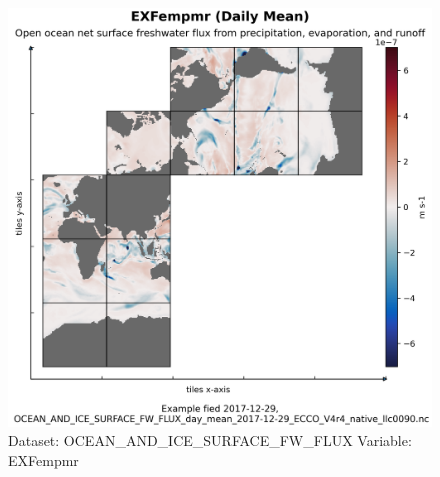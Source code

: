 \begin{figure}[H]
\centering
\includegraphics[width=\textwidth]{../images/plots/native_plots/Ocean_and_Sea-Ice_Surface_Freshwater_Fluxes/EXFempmr.png}
\caption{Dataset: OCEAN\_AND\_ICE\_SURFACE\_FW\_FLUX Variable: EXFempmr}
\label{tab:table-OCEAN_AND_ICE_SURFACE_FW_FLUX_EXFempmr-Plot}
\end{figure}
\pagebreak
